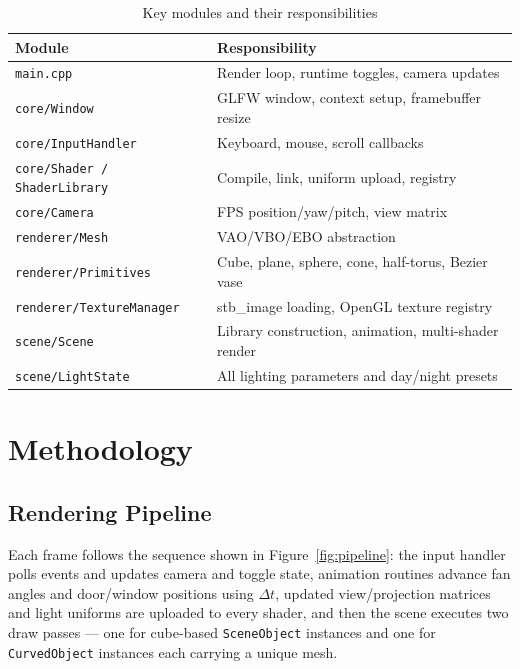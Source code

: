 \documentclass[12pt, a4paper]{article}
\begin{document}
\begin{table}[H]
    \centering
    \caption{Key modules and their responsibilities}
    \begin{tabular}{ll}
        \toprule
        \textbf{Module} & \textbf{Responsibility} \\
        \midrule
        \texttt{main.cpp} & Render loop, runtime toggles, camera updates \\
        \texttt{core/Window} & GLFW window, context setup, framebuffer resize \\
        \texttt{core/InputHandler} & Keyboard, mouse, scroll callbacks \\
        \texttt{core/Shader / ShaderLibrary} & Compile, link, uniform upload, registry \\
        \texttt{core/Camera} & FPS position/yaw/pitch, view matrix \\
        \texttt{renderer/Mesh} & VAO/VBO/EBO abstraction \\
        \texttt{renderer/Primitives} & Cube, plane, sphere, cone, half-torus, Bezier vase \\
        \texttt{renderer/TextureManager} & stb\_image loading, OpenGL texture registry \\
        \texttt{scene/Scene} & Library construction, animation, multi-shader render \\
        \texttt{scene/LightState} & All lighting parameters and day/night presets \\
        \bottomrule
    \end{tabular}
    \label{tab:modules}
\end{table}

\section{Methodology}

\subsection{Rendering Pipeline}

Each frame follows the sequence shown in Figure~\ref{fig:pipeline}: the input handler polls events and updates camera and toggle state, animation routines advance fan angles and door/window positions using $\Delta t$, updated view/projection matrices and light uniforms are uploaded to every shader, and then the scene executes two draw passes — one for cube-based \texttt{SceneObject} instances and one for \texttt{CurvedObject} instances each carrying a unique mesh.
\end{document}
